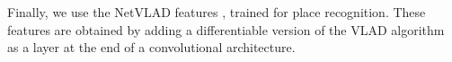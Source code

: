Finally, we use the NetVLAD features \cite{Arandjelovic15}, trained for place recognition. These features are obtained by adding a differentiable version of the VLAD algorithm~\cite{Delhumeau2013} as a layer at the end of a convolutional architecture.



